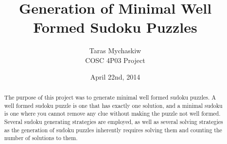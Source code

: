 \documentclass[12pt]{article}
\title{Generation of Minimal Well Formed Sudoku Puzzles}
\author{Taras Mychaskiw\\COSC 4P03 Project}
\date{April 22nd, 2014}
\begin{document}
\maketitle
    \begin{abstract}
    The purpose of this project was to generate minimal well formed sudoku puzzles. A well formed sudoku puzzle is one that has
    exactly one solution, and a minimal sudoku is one where you cannot remove any clue without making the puzzle not well formed.
    Several sudoku generating strategies are employed, as well as several solving strategies as the generation of sudoku puzzles
    inherently requires solving them and counting the number of solutions to them.
    \end{abstract}

    \thispagestyle{empty}
    \setcounter{tocdepth}{2}
    \tableofcontents
    \thispagestyle{empty}
    \mbox{}
    \clearpage
    \setcounter{page}{1}
    
    
    
    
    
    
    
    
    
    
    
    
\end{document}
